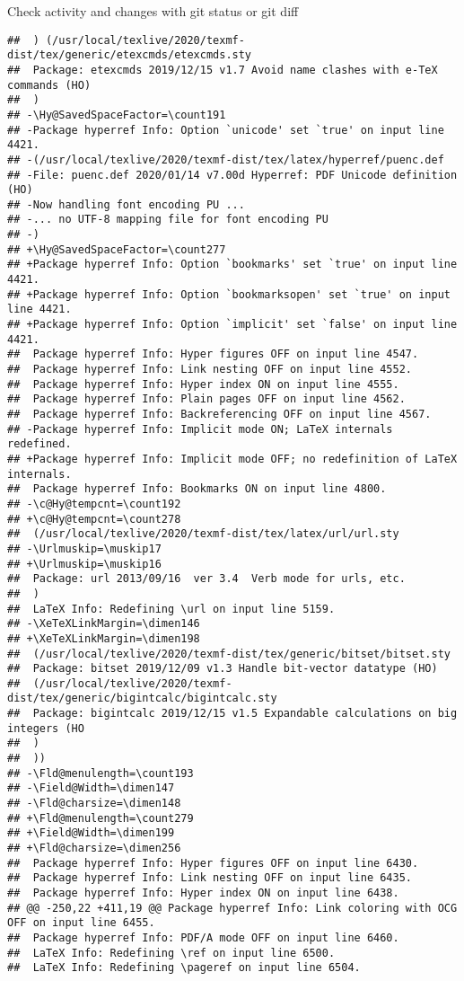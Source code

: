 \documentclass[ignorenonframetext,]{beamer}
\begin{document}
\begin{frame}[fragile]{Check activity and changes with git status or git
diff}
\begin{verbatim}
##  ) (/usr/local/texlive/2020/texmf-dist/tex/generic/etexcmds/etexcmds.sty
##  Package: etexcmds 2019/12/15 v1.7 Avoid name clashes with e-TeX commands (HO)
##  )
## -\Hy@SavedSpaceFactor=\count191
## -Package hyperref Info: Option `unicode' set `true' on input line 4421.
## -(/usr/local/texlive/2020/texmf-dist/tex/latex/hyperref/puenc.def
## -File: puenc.def 2020/01/14 v7.00d Hyperref: PDF Unicode definition (HO)
## -Now handling font encoding PU ...
## -... no UTF-8 mapping file for font encoding PU
## -)
## +\Hy@SavedSpaceFactor=\count277
## +Package hyperref Info: Option `bookmarks' set `true' on input line 4421.
## +Package hyperref Info: Option `bookmarksopen' set `true' on input line 4421.
## +Package hyperref Info: Option `implicit' set `false' on input line 4421.
##  Package hyperref Info: Hyper figures OFF on input line 4547.
##  Package hyperref Info: Link nesting OFF on input line 4552.
##  Package hyperref Info: Hyper index ON on input line 4555.
##  Package hyperref Info: Plain pages OFF on input line 4562.
##  Package hyperref Info: Backreferencing OFF on input line 4567.
## -Package hyperref Info: Implicit mode ON; LaTeX internals redefined.
## +Package hyperref Info: Implicit mode OFF; no redefinition of LaTeX internals.
##  Package hyperref Info: Bookmarks ON on input line 4800.
## -\c@Hy@tempcnt=\count192
## +\c@Hy@tempcnt=\count278
##  (/usr/local/texlive/2020/texmf-dist/tex/latex/url/url.sty
## -\Urlmuskip=\muskip17
## +\Urlmuskip=\muskip16
##  Package: url 2013/09/16  ver 3.4  Verb mode for urls, etc.
##  )
##  LaTeX Info: Redefining \url on input line 5159.
## -\XeTeXLinkMargin=\dimen146
## +\XeTeXLinkMargin=\dimen198
##  (/usr/local/texlive/2020/texmf-dist/tex/generic/bitset/bitset.sty
##  Package: bitset 2019/12/09 v1.3 Handle bit-vector datatype (HO)
##  (/usr/local/texlive/2020/texmf-dist/tex/generic/bigintcalc/bigintcalc.sty
##  Package: bigintcalc 2019/12/15 v1.5 Expandable calculations on big integers (HO
##  )
##  ))
## -\Fld@menulength=\count193
## -\Field@Width=\dimen147
## -\Fld@charsize=\dimen148
## +\Fld@menulength=\count279
## +\Field@Width=\dimen199
## +\Fld@charsize=\dimen256
##  Package hyperref Info: Hyper figures OFF on input line 6430.
##  Package hyperref Info: Link nesting OFF on input line 6435.
##  Package hyperref Info: Hyper index ON on input line 6438.
## @@ -250,22 +411,19 @@ Package hyperref Info: Link coloring with OCG OFF on input line 6455.
##  Package hyperref Info: PDF/A mode OFF on input line 6460.
##  LaTeX Info: Redefining \ref on input line 6500.
##  LaTeX Info: Redefining \pageref on input line 6504.

\end{verbatim}
\end{frame}
\end{document}
